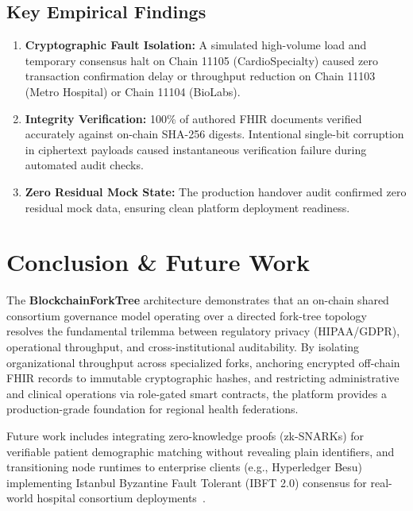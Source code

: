\documentclass[conference]{IEEEtran}
\theoremstyle{definition}
\begin{document}
\subsection{Key Empirical Findings}
\begin{enumerate}
    \item \textbf{Cryptographic Fault Isolation:} A simulated high-volume load and temporary consensus halt on Chain 11105 (CardioSpecialty) caused zero transaction confirmation delay or throughput reduction on Chain 11103 (Metro Hospital) or Chain 11104 (BioLabs).
    \item \textbf{Integrity Verification:} 100\% of authored FHIR documents verified accurately against on-chain SHA-256 digests. Intentional single-bit corruption in ciphertext payloads caused instantaneous verification failure during automated audit checks.
    \item \textbf{Zero Residual Mock State:} The production handover audit confirmed zero residual mock data, ensuring clean platform deployment readiness.
\end{enumerate}

\section{Conclusion \& Future Work}
The \textbf{BlockchainForkTree} architecture demonstrates that an on-chain shared consortium governance model operating over a directed fork-tree topology resolves the fundamental trilemma between regulatory privacy (HIPAA/GDPR), operational throughput, and cross-institutional auditability. By isolating organizational throughput across specialized forks, anchoring encrypted off-chain FHIR records to immutable cryptographic hashes, and restricting administrative and clinical operations via role-gated smart contracts, the platform provides a production-grade foundation for regional health federations.

Future work includes integrating zero-knowledge proofs (zk-SNARKs) for verifiable patient demographic matching without revealing plain identifiers, and transitioning node runtimes to enterprise clients (e.g., Hyperledger Besu) implementing Istanbul Byzantine Fault Tolerant (IBFT 2.0) consensus for real-world hospital consortium deployments~\cite{castro2002practical, wood2014ethereum}.



\end{document}
